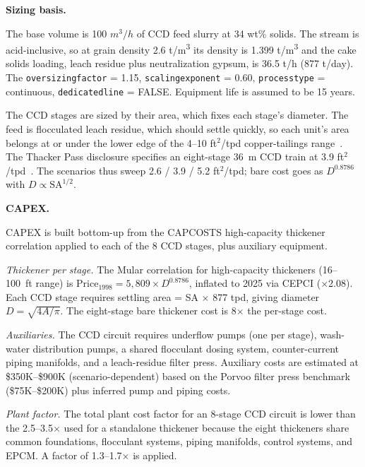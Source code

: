 \documentclass{article}
\renewcommand\_{\textunderscore\allowbreak}
\begin{document}
\medskip
\noindent\textbf{Sizing basis.}\quad

The base volume is 100 $\si{m^3/h}$ of CCD feed slurry at 34 wt\% solids. The stream is acid-inclusive, so at grain density 2.6 \si{t/m^3} its density is 1.399 \si{t/m^3} and the cake solids loading, leach residue plus neutralization gypsum, is 36.5 t/h (877 t/day). The \texttt{oversizing\_factor} = 1.15, \texttt{scaling\_exponent} = 0.60, \texttt{process\_type} = continuous, \texttt{dedicated\_line} = FALSE. Equipment life is assumed to be 15 years.

The CCD stages are sized by their area, which fixes each stage's diameter. The feed is flocculated leach residue, which should settle quickly, so each unit's area belongs at or under the lower edge of the 4--10 ft$^2$/tpd copper-tailings range~\citep[p.~270]{mularCAPCOSTSHandbookEstimating1998}. The Thacker Pass disclosure specifies an eight-stage 36~m CCD train at 3.9 ft$^2$/tpd~\citep{sgscanadaincSK1300Technical2024}. The scenarios thus sweep 2.6 / 3.9 / 5.2 ft$^2$/tpd; bare cost goes as $D^{0.8786}$ with $D \propto \mathrm{SA}^{1/2}$. 

\medskip
\noindent\textbf{CAPEX.}\quad

CAPEX is built bottom-up from the CAPCOSTS high-capacity thickener correlation applied to each of the 8 CCD stages, plus auxiliary equipment.

\textit{Thickener per stage.} The Mular correlation for high-capacity thickeners (16--100~ft range) is $\text{Price}_{1998} = 5,809 \times D^{0.8786}$, inflated to 2025 via CEPCI ($\times$2.08). Each CCD stage requires settling area = SA $\times$ 877 tpd, giving diameter $D = \sqrt{4A/\pi}$. The eight-stage bare thickener cost is 8$\times$ the per-stage cost.

\textit{Auxiliaries.} The CCD circuit requires underflow pumps (one per stage), wash-water distribution pumps, a shared flocculant dosing system, counter-current piping manifolds, and a leach-residue filter press. Auxiliary costs are estimated at \$350K--\$900K (scenario-dependent) based on the Porvoo filter press benchmark (\$75K--\$200K) plus inferred pump and piping costs.

\textit{Plant factor.} The total plant cost factor for an 8-stage CCD circuit is lower than the 2.5--3.5$\times$ used for a standalone thickener because the eight thickeners share common foundations, flocculant systems, piping manifolds, control systems, and EPCM. A factor of 1.3--1.7$\times$ is applied.
\end{document}
